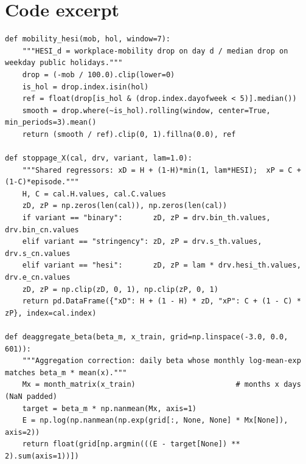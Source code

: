 \documentclass{article}
\theoremstyle{plain}
\theoremstyle{definition}
\theoremstyle{remark}
\begin{document}
\section{Code excerpt}\label{app:code}
\begin{lstlisting}
def mobility_hesi(mob, hol, window=7):
    """HESI_d = workplace-mobility drop on day d / median drop on weekday public holidays."""
    drop = (-mob / 100.0).clip(lower=0)
    is_hol = drop.index.isin(hol)
    ref = float(drop[is_hol & (drop.index.dayofweek < 5)].median())
    smooth = drop.where(~is_hol).rolling(window, center=True, min_periods=3).mean()
    return (smooth / ref).clip(0, 1).fillna(0.0), ref

def stoppage_X(cal, drv, variant, lam=1.0):
    """Shared regressors: xD = H + (1-H)*min(1, lam*HESI);  xP = C + (1-C)*episode."""
    H, C = cal.H.values, cal.C.values
    zD, zP = np.zeros(len(cal)), np.zeros(len(cal))
    if variant == "binary":       zD, zP = drv.bin_th.values, drv.bin_cn.values
    elif variant == "stringency": zD, zP = drv.s_th.values, drv.s_cn.values
    elif variant == "hesi":       zD, zP = lam * drv.hesi_th.values, drv.e_cn.values
    zD, zP = np.clip(zD, 0, 1), np.clip(zP, 0, 1)
    return pd.DataFrame({"xD": H + (1 - H) * zD, "xP": C + (1 - C) * zP}, index=cal.index)

def deaggregate_beta(beta_m, x_train, grid=np.linspace(-3.0, 0.0, 601)):
    """Aggregation correction: daily beta whose monthly log-mean-exp matches beta_m * mean(x)."""
    Mx = month_matrix(x_train)                       # months x days (NaN padded)
    target = beta_m * np.nanmean(Mx, axis=1)
    E = np.log(np.nanmean(np.exp(grid[:, None, None] * Mx[None]), axis=2))
    return float(grid[np.argmin(((E - target[None]) ** 2).sum(axis=1))])
\end{lstlisting}
\end{document}
